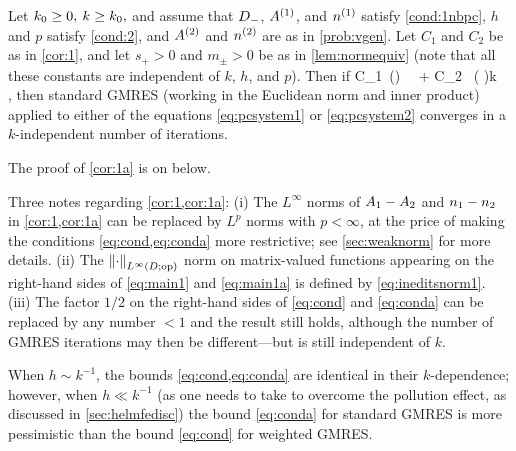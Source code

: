 \noindent Let $k_{0} \geq 0,$ $k \geq k_{0},$ and assume that $D_{-}$, ${A}^{(1)}$, and ${n}^{(1)}$ satisfy \cref{cond:1nbpc}, $h$ and $p$ satisfy \cref{cond:2}, and ${A}^{(2)}$ and ${n}^{(2)}$ are as in \cref{prob:vgen}. Let $C_1$ and $C_2$ be as in \cref{cor:1}, and let $s_{+}>0$ and $m_{\pm}>0$ be as in \cref{lem:normequiv} (note that all these constants are independent of $k$, $h$, and $p$). Then if 
\beq\label{eq:conda}
 C_1 \,\left(\right) \, \,
\NLiDop{\Aso-\Ast} + C_2 \, \left( \right)k \, \NLiDRR{\nso-\nst},
\leq {}
\eeq
then standard GMRES (working in the Euclidean norm and inner product) applied to either of the equations \cref{eq:pcsystem1} or \cref{eq:pcsystem2}
 converges in a $k$-independent number of iterations.
 \enth

 The proof of \cref{cor:1a} is on  below.

Three notes regarding \cref{cor:1,cor:1a}: (i) The $L^\infty$ norms of $A_{1}-A_{2}$ and $n_{1}-n_{2}$ in \cref{cor:1,cor:1a} can be replaced by $L^p$ norms with $p < \infty$, at the price of making the conditions \cref{eq:cond,eq:conda} more restrictive; see \cref{sec:weaknorm} for more details. (ii) The $\NLiDop{\cdot}$ norm on matrix-valued functions appearing on the right-hand sides of \cref{eq:main1} and \cref{eq:main1a} is defined by \cref{eq:ineditsnorm1}.
(iii) The factor $1/2$ on the right-hand sides of \cref{eq:cond} and \cref{eq:conda} can be replaced by any number $<1$ and the result still holds, although the number of GMRES iterations may then be different---but is still independent of $k$.

\bre
When $h\sim  k^{-1}$, the bounds \cref{eq:cond,eq:conda} are identical in their $k$-dependence; however, when $h\ll k^{-1}$ (as one needs to take to overcome the pollution effect, as discussed in \cref{sec:helmfedisc}) the bound \cref{eq:conda} for standard GMRES is more pessimistic than the bound \cref{eq:cond} for weighted GMRES.
\ere

